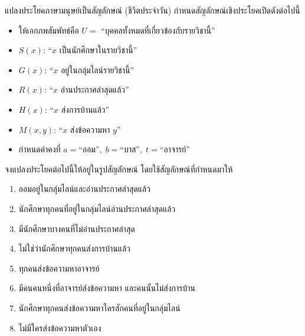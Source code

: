 \begin{exam}{แปลงประโยคภาษามนุษย์เป็นสัญลักษณ์ (ชีวิตประจำวัน)}{}
	กำหนดสัญลักษณ์เชิงประโยคเปิดดังต่อไปนี้
	\begin{itemize}
		\item ให้เอกภพสัมพัทธ์คือ $U =$ “บุคคลทั้งหมดที่เกี่ยวข้องกับรายวิชานี้”
		\item $S(x)$: ``$x$ เป็นนักศึกษาในรายวิชานี้''
		\item $G(x)$: ``$x$ อยู่ในกลุ่มไลน์รายวิชานี้''
		\item $R(x)$: ``$x$ อ่านประกาศล่าสุดแล้ว''
		\item $H(x)$: ``$x$ ส่งการบ้านแล้ว''
		\item $M(x,y)$: ``$x$ ส่งข้อความหา $y$''
		\item กำหนดค่าคงที่ $a=\text{``ออม''},\; b=\text{``บาส''},\; t=\text{``อาจารย์''}$
	\end{itemize}
	
	จงแปลงประโยคต่อไปนี้ให้อยู่ในรูปสัญลักษณ์ โดยใช้สัญลักษณ์ที่กำหนดมาให้
	\begin{enumerate}
		\item ออมอยู่ในกลุ่มไลน์และอ่านประกาศล่าสุดแล้ว
		\item นักศึกษาทุกคนที่อยู่ในกลุ่มไลน์อ่านประกาศล่าสุดแล้ว
		\item มีนักศึกษาบางคนที่ไม่อ่านประกาศล่าสุด
		\item ไม่ใช่ว่านักศึกษาทุกคนส่งการบ้านแล้ว
		\item ทุกคนส่งข้อความหาอาจารย์
		\item มีคนคนหนึ่งที่อาจารย์ส่งข้อความหา และคนนั้นไม่ส่งการบ้าน
		\item นักศึกษาทุกคนส่งข้อความหาใครสักคนที่อยู่ในกลุ่มไลน์
		\item ไม่มีใครส่งข้อความหาตัวเอง
	\end{enumerate}
\end{exam}

